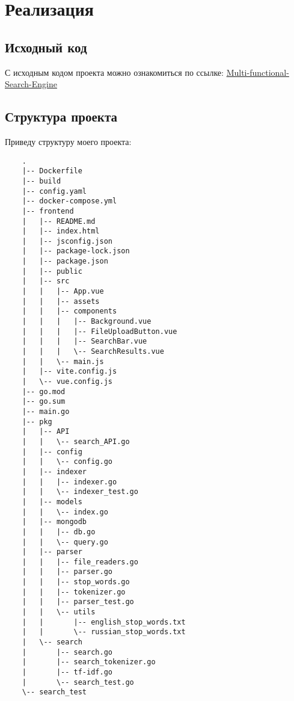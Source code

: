 \section{Реализация}
\subsection{Исходный код}
С исходным кодом проекта можно ознакомиться по ссылке: 
\href{https://github.com/FoggGhostt/Multi-functional-Search-Engine}{Multi-functional-Search-Engine}
\subsection{Структура проекта}
Приведу структуру моего проекта:
\tiny 
\begin{verbatim}
    .
    |-- Dockerfile
    |-- build
    |-- config.yaml
    |-- docker-compose.yml
    |-- frontend
    |   |-- README.md
    |   |-- index.html
    |   |-- jsconfig.json
    |   |-- package-lock.json
    |   |-- package.json
    |   |-- public
    |   |-- src
    |   |   |-- App.vue
    |   |   |-- assets
    |   |   |-- components
    |   |   |   |-- Background.vue
    |   |   |   |-- FileUploadButton.vue
    |   |   |   |-- SearchBar.vue
    |   |   |   \-- SearchResults.vue
    |   |   \-- main.js
    |   |-- vite.config.js
    |   \-- vue.config.js
    |-- go.mod
    |-- go.sum
    |-- main.go
    |-- pkg
    |   |-- API
    |   |   \-- search_API.go
    |   |-- config
    |   |   \-- config.go
    |   |-- indexer
    |   |   |-- indexer.go
    |   |   \-- indexer_test.go
    |   |-- models
    |   |   \-- index.go
    |   |-- mongodb
    |   |   |-- db.go
    |   |   \-- query.go
    |   |-- parser
    |   |   |-- file_readers.go
    |   |   |-- parser.go
    |   |   |-- stop_words.go
    |   |   |-- tokenizer.go
    |   |   |-- parser_test.go
    |   |   \-- utils
    |   |       |-- english_stop_words.txt
    |   |       \-- russian_stop_words.txt
    |   \-- search
    |       |-- search.go
    |       |-- search_tokenizer.go
    |       |-- tf-idf.go
    |       \-- search_test.go
    \-- search_test
\end{verbatim}

\newpage
\normalsize

